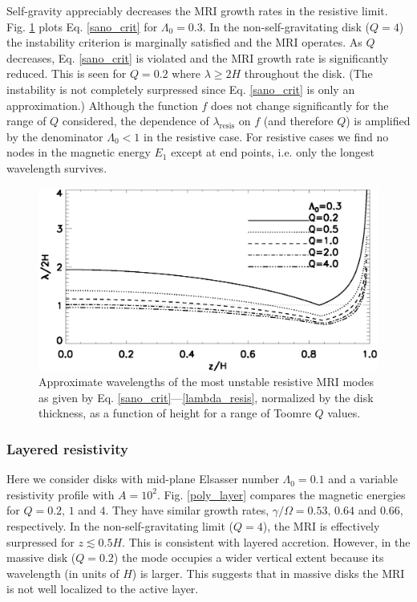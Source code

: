 Self-gravity appreciably decreases the MRI growth rates in the
resistive limit. Fig. \ref{lambda_poly_resis} plots 
Eq. \ref{sano_crit} for $\Lambda_0=0.3$. In the non-self-gravitating
disk ($Q=4$) the instability criterion is marginally satisfied and the
MRI operates. As $Q$ decreases, 
Eq. \ref{sano_crit} is violated and the MRI growth rate is
significantly reduced. This is seen for $Q=0.2$ where $\lambda \geq 2H$ throughout
the disk. (The instability is not completely surpressed since
Eq. \ref{sano_crit} is only an approximation.) Although the function
$f$ does not change significantly for the range of $Q$ considered, the
dependence of $\lambda_\mathrm{resis}$ on $f$ (and therefore $Q$) is
amplified by the denominator $\Lambda_0<1$ in the resistive case. For
resistive cases we find no nodes in the magnetic energy $E_1$ except
at end points, i.e. only the longest wavelength survives.   

\begin{figure}
  \includegraphics[width=\linewidth]{figures/lambda_poly_uniresis}
  \caption{Approximate wavelengths of the most unstable resistive MRI modes as given by
    Eq. \ref{sano_crit}---\ref{lambda_resis}, normalized by the 
    disk thickness, as a function of height for a range of Toomre $Q$
    values.  
    \label{lambda_poly_resis}}
\end{figure}


\subsubsection{Layered
  resistivity} 
Here we consider disks with mid-plane Elsasser number $\Lambda_0=0.1$
and a variable resistivity profile with
$A=10^2$. Fig. \ref{poly_layer} compares the magnetic  
energies for $Q=0.2,\,1$ and $4$. They have similar growth rates, $\gamma/\Omega
= 0.53,\,0.64$ and $0.66$, respectively. In the non-self-gravitating
limit ($Q=4$), the MRI is effectively surpressed for
$z\lesssim0.5H$. This is consistent with layered accretion. However,
in the massive disk ($Q=0.2$) the mode occupies a wider vertical
extent because its wavelength (in units of $H$) is larger. This
suggests that in massive disks the MRI is not well localized to the
active layer. 

